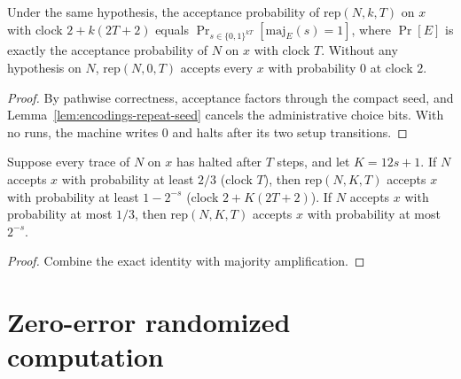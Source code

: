 \begin{theorem}
  \label{thm:encodings-repeat-prob}
  \leanok
  Under the same hypothesis, the acceptance probability of
  $\mathrm{rep}(N, k, T)$ on $x$ with clock $2 + k(2T + 2)$ equals
  $\Pr_{s \in \{0,1\}^{kT}}[\mathrm{maj}_E(s) = 1]$, where $\Pr[E]$ is
  exactly the acceptance probability of $N$ on $x$ with clock $T$. Without any
  hypothesis on $N$, $\mathrm{rep}(N, 0, T)$ accepts every $x$ with
  probability $0$ at clock $2$.
\end{theorem}
\begin{proof}
  \leanok
  By pathwise correctness, acceptance factors through the compact seed, and
  Lemma~\ref{lem:encodings-repeat-seed} cancels the administrative choice
  bits. With no runs, the machine writes $0$ and halts after its two setup
  transitions.
\end{proof}

\begin{theorem}
  \label{thm:encodings-repeat-amplification}
  \leanok
  Suppose every trace of $N$ on $x$ has halted after $T$ steps, and let
  $K = 12s + 1$. If $N$ accepts $x$ with probability at least $2/3$ (clock
  $T$), then $\mathrm{rep}(N, K, T)$ accepts $x$ with probability at least
  $1 - 2^{-s}$ (clock $2 + K(2T + 2)$). If $N$ accepts $x$ with probability at
  most $1/3$, then $\mathrm{rep}(N, K, T)$ accepts $x$ with probability at most
  $2^{-s}$.
\end{theorem}
\begin{proof}
  \leanok
  Combine the exact identity with majority amplification.
\end{proof}

\section{Zero-error randomized computation}

